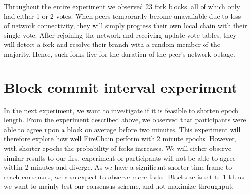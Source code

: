 \documentclass[USenglish]{uit-thesis}
\begin{document}
Throughout the entire experiment we observed 23 fork blocks, all of which only had either 1 or 2 votes.
When peers temporarily become unavailable due to loss of network connectivity, they will simply progress their own local chain with their single vote.
After rejoining the network and receiving update vote tables, they will detect a fork and resolve their branch with a random member of the majority.
Hence, such forks live for the duration of the peer's network outage.

 


 


\section{Block commit interval experiment}
In the next experiment, we want to investigate if it is feasible to shorten epoch length.
From the experiment described above, we observed that participants were able to agree upon a block on average before two minutes. 
This experiment will therefore explore how well FireChain perform with 2 minute epochs.
However, with shorter epochs the probability of forks increases.
We will either observe similar results to our first experiment or participants will not be able to agree within 2 minutes and diverge.
As we have a significant shorter time frame to reach consensus, we also expect to observe more forks.
Blocksize is set to 1 \gls{kb} as we want to mainly test our consensus scheme, and not maximize throughput.
\end{document}
